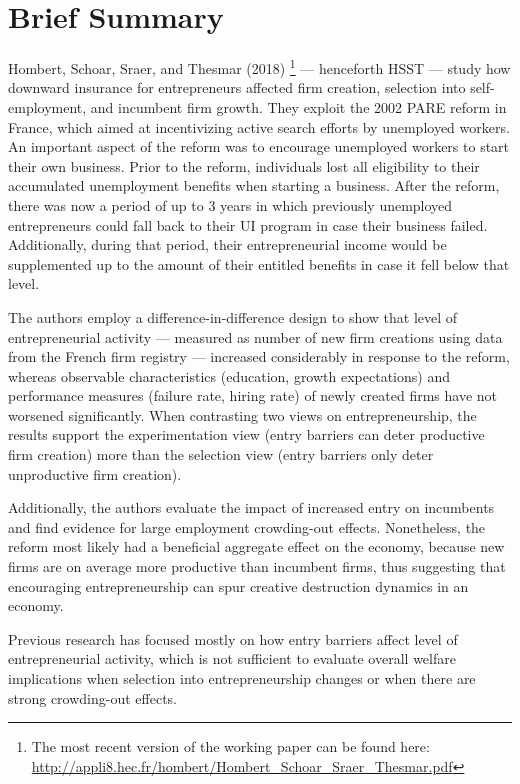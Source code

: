 

\section{Brief Summary}

Hombert, Schoar, Sraer, and Thesmar (2018)
\footnote{The most recent version of the working paper can be found here: \url{http://appli8.hec.fr/hombert/Hombert_Schoar_Sraer_Thesmar.pdf}}
--- henceforth HSST --- study how downward insurance for entrepreneurs affected firm creation, selection into self-employment, and incumbent firm growth. They exploit the 2002 PARE reform in France, which aimed at incentivizing active search efforts by unemployed workers. An important aspect of the reform was to encourage unemployed workers to start their own business. Prior to the reform, individuals lost all eligibility to their accumulated unemployment benefits when starting a business. After the reform, there was now a period of up to 3 years in which previously unemployed entrepreneurs could fall back to their UI program in case their business failed. Additionally, during that period, their entrepreneurial income would be supplemented up to the amount of their entitled benefits in case it fell below that level. \newline

\noindent The authors employ a difference-in-difference design to show that level of entrepreneurial activity --- measured as number of new firm creations using data from the French firm registry --- increased considerably in response to the reform, whereas observable characteristics (education, growth expectations) and performance measures (failure rate, hiring rate) of newly created firms have not worsened significantly. When contrasting two views on entrepreneurship, the results support the experimentation view (entry barriers can deter productive firm creation) more than the selection view (entry barriers only deter unproductive firm creation).

Additionally, the authors evaluate the impact of increased entry on incumbents and find evidence for large employment crowding-out effects. Nonetheless, the reform most likely had a beneficial aggregate effect on the economy, because new firms are on average more productive than incumbent firms, thus suggesting that encouraging entrepreneurship can spur creative destruction dynamics in an economy.

Previous research has focused mostly on how entry barriers affect level of entrepreneurial activity, which is not sufficient to evaluate overall welfare implications when selection into entrepreneurship changes or when there are strong crowding-out effects.


